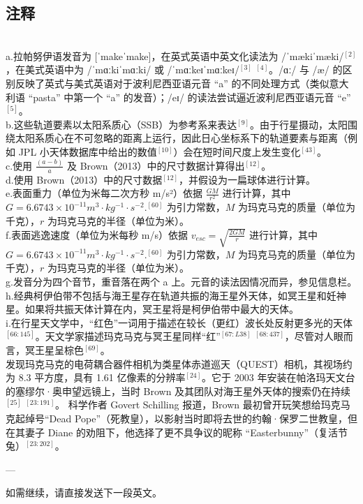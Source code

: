 \subsection{注释}\\
a.拉帕努伊语发音为 [ˈmakeˈmake]，在英式英语中英文化读法为 /ˈmækiˈmæki/$^{[2]}$，在美式英语中为 /ˈmɑːkiˈmɑːki/ 或 /ˈmɑːkeɪˈmɑːkeɪ/$^{[3]}$ $^{[4]}$。/ɑː/ 与 /æ/ 的区别反映了英式与美式英语对于波利尼西亚语元音 “a” 的不同处理方式（类似意大利语 “pasta” 中第一个 “a” 的发音）；/eɪ/ 的读法尝试逼近波利尼西亚语元音 “e”$^{[5]}$。\\
b.这些轨道要素以太阳系质心（SSB）为参考系来表达$^{[9]}$。由于行星摄动，太阳围绕太阳系质心在不可忽略的距离上运行，因此日心坐标系下的轨道要素与距离（例如 JPL 小天体数据库中给出的数值$^{[10]}$）会在短时间尺度上发生变化$^{[43]}$。\\
c.使用 $\frac{(a - b)}{a}$ 及 Brown（2013）中的尺寸数据计算得出$^{[12]}$。\\
d.使用 Brown（2013）中的尺寸数据$^{[12]}$，并假设为一扁球体进行计算。\\
e.表面重力（单位为米每二次方秒 m/s²）依据
$\frac{GM}{r^{2}}$
进行计算，其中$G = 6.6743\times10^{-11} m^3\cdot kg^{-1}\cdot s^{-2}$.$^{[60]}$ 为引力常数，$M$ 为玛克马克的质量（单位为千克），$r$ 为玛克马克的半径（单位为米）。\\
f.表面逃逸速度（单位为米每秒 m/s）依据
$v_{esc} = \sqrt{\frac{2GM}{r}}$
进行计算，其中 $G = 6.6743\times10^{-11}m^3\cdot kg^{-1}\cdot s^{-2}$.$^{[60]}$ 为引力常数，$M$ 为玛克马克的质量（单位为千克），$r$ 为玛克马克的半径（单位为米）。\\
g.发音分为四个音节，重音落在两个 a 上。元音的读法因情况而异，参见信息栏。
h.经典柯伊伯带不包括与海王星存在轨道共振的海王星外天体，如冥王星和妊神星。如果将共振天体计算在内，冥王星将是柯伊伯带中最大的天体。\\
i.在行星天文学中，“红色”一词用于描述在较长（更红）波长处反射更多光的天体$^{[66:145]}$。天文学家描述玛克马克与冥王星同样“红”$^{[67:L38]}$ $^{[68:437]}$，尽管对人眼而言，冥王星呈棕色$^{[69]}$。\\
发现玛克马克的电荷耦合器件相机为类星体赤道巡天（QUEST）相机，其视场约为 8.3 平方度，具有 1.61 亿像素的分辨率$^{[24]}$。它于 2003 年安装在帕洛玛天文台的塞缪尔·奥申望远镜上，当时 Brown 及其团队对海王星外天体的搜索仍在持续$^{[25]}$ $^{[23:191]}$。
科学作者 Govert Schilling 报道，Brown 最初曾开玩笑想给玛克马克起绰号“Dead Pope”（死教皇），以影射当时即将去世的约翰·保罗二世教皇，但在其妻子 Diane 的劝阻下，他选择了更不具争议的昵称 “Easterbunny”（复活节兔）$^{[23:202]}$。

---

如需继续，请直接发送下一段英文。
